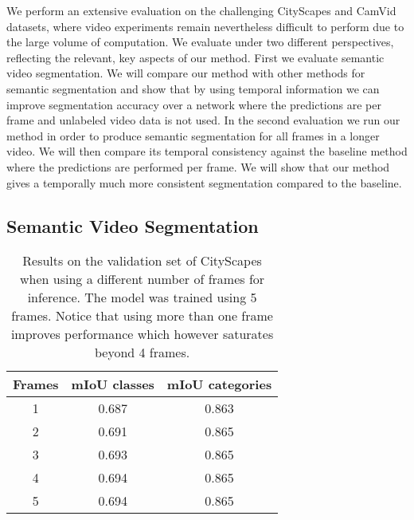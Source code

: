 \documentclass[10pt,twocolumn,letterpaper]{article}
\begin{document}
We perform an extensive evaluation on the challenging CityScapes and CamVid datasets, where video experiments remain nevertheless difficult to perform due to the large volume of computation. We evaluate under two different perspectives, reflecting the relevant, key aspects of our method. First we evaluate semantic video segmentation. We will compare our method with other methods for semantic segmentation and show that by using temporal information we can improve segmentation accuracy over a network where the predictions are per frame and unlabeled video data is not used. In the second evaluation we run our method in order to produce semantic segmentation for all frames in a longer video. We will then compare its temporal consistency against the baseline method where the predictions are performed per frame. We will show that our method gives a temporally much more consistent segmentation compared to the baseline.






\subsection{Semantic Video Segmentation}


\begin{table}[!htbp]
\begin{center}
\begin{tabular}{|c||c|c|}
\hline
Frames & mIoU classes & mIoU categories \\
\hline
\hline
1 & 0.687 & 0.863 \\
2 & 0.691 & 0.865 \\
3 & 0.693 & 0.865 \\
4 & 0.694 & 0.865 \\
5 & 0.694 & 0.865 \\
\hline \end{tabular}
\end{center}
\caption{Results on the validation set of CityScapes when using a different number of frames for inference. The model was trained using 5 frames. Notice that using more than one frame improves performance which however saturates beyond 4 frames.}
\label{Cityscapes_nbr_frames_table}
\end{table}
\end{document}
